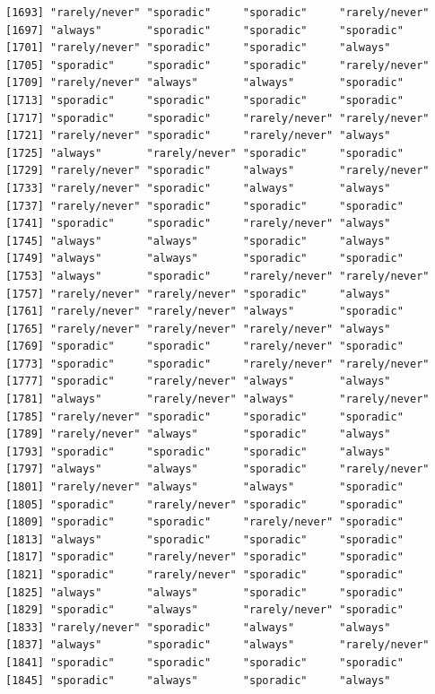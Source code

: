 \documentclass[
  letterpaper,
  DIV=11,
  numbers=noendperiod]{scrartcl}
\begin{document}
\begin{verbatim}
[1693] "rarely/never" "sporadic"     "sporadic"     "rarely/never"
[1697] "always"       "sporadic"     "sporadic"     "sporadic"    
[1701] "rarely/never" "sporadic"     "sporadic"     "always"      
[1705] "sporadic"     "sporadic"     "sporadic"     "rarely/never"
[1709] "rarely/never" "always"       "always"       "sporadic"    
[1713] "sporadic"     "sporadic"     "sporadic"     "sporadic"    
[1717] "sporadic"     "sporadic"     "rarely/never" "rarely/never"
[1721] "rarely/never" "sporadic"     "rarely/never" "always"      
[1725] "always"       "rarely/never" "sporadic"     "sporadic"    
[1729] "rarely/never" "sporadic"     "always"       "rarely/never"
[1733] "rarely/never" "sporadic"     "always"       "always"      
[1737] "rarely/never" "sporadic"     "sporadic"     "sporadic"    
[1741] "sporadic"     "sporadic"     "rarely/never" "always"      
[1745] "always"       "always"       "sporadic"     "always"      
[1749] "always"       "always"       "sporadic"     "sporadic"    
[1753] "always"       "sporadic"     "rarely/never" "rarely/never"
[1757] "rarely/never" "rarely/never" "sporadic"     "always"      
[1761] "rarely/never" "rarely/never" "always"       "sporadic"    
[1765] "rarely/never" "rarely/never" "rarely/never" "always"      
[1769] "sporadic"     "sporadic"     "rarely/never" "sporadic"    
[1773] "sporadic"     "sporadic"     "rarely/never" "rarely/never"
[1777] "sporadic"     "rarely/never" "always"       "always"      
[1781] "always"       "rarely/never" "always"       "rarely/never"
[1785] "rarely/never" "sporadic"     "sporadic"     "sporadic"    
[1789] "rarely/never" "always"       "sporadic"     "always"      
[1793] "sporadic"     "sporadic"     "sporadic"     "always"      
[1797] "always"       "always"       "sporadic"     "rarely/never"
[1801] "rarely/never" "always"       "always"       "sporadic"    
[1805] "sporadic"     "rarely/never" "sporadic"     "sporadic"    
[1809] "sporadic"     "sporadic"     "rarely/never" "sporadic"    
[1813] "always"       "sporadic"     "sporadic"     "sporadic"    
[1817] "sporadic"     "rarely/never" "sporadic"     "sporadic"    
[1821] "sporadic"     "rarely/never" "sporadic"     "sporadic"    
[1825] "always"       "always"       "sporadic"     "sporadic"    
[1829] "sporadic"     "always"       "rarely/never" "sporadic"    
[1833] "rarely/never" "sporadic"     "always"       "always"      
[1837] "always"       "sporadic"     "always"       "rarely/never"
[1841] "sporadic"     "sporadic"     "sporadic"     "sporadic"    
[1845] "sporadic"     "always"       "sporadic"     "always"      

\end{verbatim}
\end{document}
